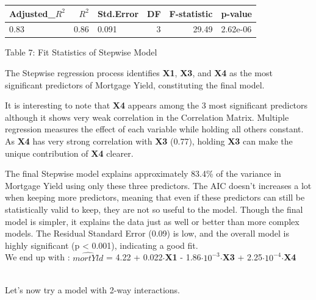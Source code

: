 \documentclass[
  12pt,
]{article}
\begin{document}
\addtocounter{table}{2}
\vspace{0.3em}
\begin{table}[!h]
\centering\begingroup\fontsize{8}{10}\selectfont

\begin{tabular}{lrlrrl}
\toprule
Adjusted\_$R^{2}$ & $R^2$ & Std.Error & DF & F-statistic & p-value\\
\midrule
0.83 & 0.86 & 0.091 & 3 & 29.49 & 2.62e-06\\
\bottomrule
\end{tabular}
\endgroup{}
\end{table}
\begin{center}
\vspace{-1.5em}
{\fontsize{12}{14}\selectfont Table 7: Fit Statistics of Stepwise Model\par}
\end{center}

The Stepwise regression process identifies \textbf{X1}, \textbf{X3}, and
\textbf{X4} as the most significant predictors of Mortgage Yield,
constituting the final model.

It is interesting to note that \textbf{X4} appears among the 3 most
significant predictors although it shows very weak correlation in the
Correlation Matrix. Multiple regression measures the effect of each
variable while holding all others constant. As \textbf{X4} has very
strong correlation with \textbf{X3} (0.77), holding \textbf{X3} can make
the unique contribution of \textbf{X4} clearer.

The final Stepwise model explains approximately 83.4\% of the variance
in Mortgage Yield using only these three predictors. The AIC doesn't
increases a lot when keeping more predictors, meaning that even if these
predictors can still be statistically valid to keep, they are not so
useful to the model. Though the final model is simpler, it explains the
data just as well or better than more complex models. The Residual
Standard Error (0.09) is low, and the overall model is highly
significant (p \textless{} 0.001), indicating a good fit.\\
We end up with : \(\hat{mortYld}\) = 4.22 + 0.022\(\cdot\)\textbf{X1} -
1.86\(\cdot\)\(10^{-3}\)\(\cdot\)\textbf{X3} +
2.25\(\cdot\)\(10^{-4}\)\(\cdot\)\textbf{X4}\\
\strut \\
Let's now try a model with 2-way interactions.
\end{document}
